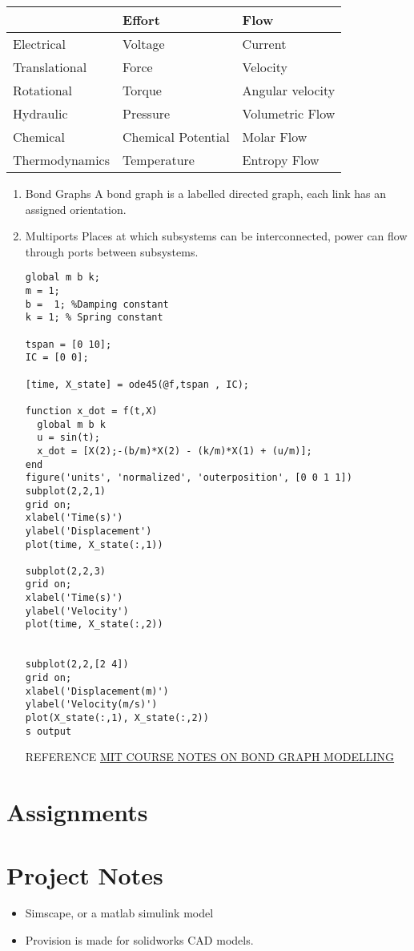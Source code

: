 \documentclass[11pt]{report}
\begin{document}
\begin{center}
\begin{tabular}{lll}
\hline
 & Effort & Flow\\
\hline
Electrical & Voltage & Current\\
Translational & Force & Velocity\\
Rotational & Torque & Angular velocity\\
Hydraulic & Pressure & Volumetric Flow\\
Chemical & Chemical Potential & Molar Flow\\
Thermodynamics & Temperature & Entropy Flow\\
\hline
\end{tabular}
\end{center}
\begin{enumerate}
\item Bond Graphs
\label{sec:org67dfe2d}
A bond graph is a labelled directed graph, each link has an assigned orientation.
\item Multiports
\label{sec:orgeb5e1c2}
Places at which subsystems can be interconnected, power can flow through ports between subsystems.

\begin{verbatim}
global m b k;
m = 1;
b =  1; %Damping constant
k = 1; % Spring constant

tspan = [0 10];
IC = [0 0];

[time, X_state] = ode45(@f,tspan , IC);

function x_dot = f(t,X)
  global m b k
  u = sin(t);
  x_dot = [X(2);-(b/m)*X(2) - (k/m)*X(1) + (u/m)];
end
figure('units', 'normalized', 'outerposition', [0 0 1 1])
subplot(2,2,1)
grid on;
xlabel('Time(s)')
ylabel('Displacement')
plot(time, X_state(:,1))

subplot(2,2,3)
grid on;
xlabel('Time(s)')
ylabel('Velocity')
plot(time, X_state(:,2))


subplot(2,2,[2 4])
grid on;
xlabel('Displacement(m)')
ylabel('Velocity(m/s)')
plot(X_state(:,1), X_state(:,2))
s output
\end{verbatim}


REFERENCE
\href{https://ocw.mit.edu/courses/2-141-modeling-and-simulation-of-dynamic-systems-fall-2006/71ca8916669d0aa6839ce780db9f5288\_bond\_graph\_intro.pdf}{MIT COURSE NOTES ON BOND GRAPH MODELLING}
\end{enumerate}
\part{Assignments}
\label{sec:orgd1f4ef8}
\part{Project Notes}
\label{sec:org9d8ec03}
\begin{itemize}
\item Simscape, or a matlab simulink model
\item Provision is made for solidworks CAD models.
\end{itemize}
\end{document}
